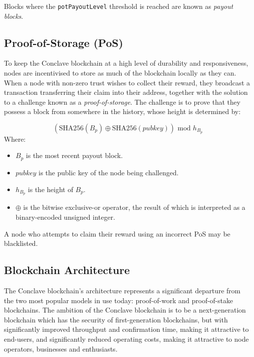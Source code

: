 \documentclass{report}
\begin{document}
		Blocks where the \texttt{potPayoutLevel} threshold is reached are known as \textit{payout blocks}. 
		
		\subsection{Proof-of-Storage (PoS)}
		To keep the Conclave blockchain at a high level of durability and responsiveness, nodes are incentivised to store as much of the blockchain locally as they can. When a node with non-zero trust wishes to collect their reward, they broadcast a transaction transferring their claim into their address, together with the solution to a challenge known as a \textit{proof-of-storage}.  The challenge  is to prove that they possess a block from somewhere in the history, whose height is determined by:
		
		\[ (\textrm{SHA256}(B_p) \oplus \textrm{SHA256}(pubkey)) \textrm{ mod } h_{B_p}  \] Where:
		
		\begin{itemize}
			\item $B_p$ is the most recent payout block.
			\item $pubkey$ is the public key of the node being challenged.
			\item $h_{B_p}$ is the height of $B_p$.
			\item $\oplus$ is the bitwise exclusive-or operator,  the result of which is interpreted as a binary-encoded unsigned integer.
		\end{itemize}
		
		A node who attempts to claim their reward using an incorrect PoS may be blacklisted. 
		
		\subsection{Blockchain Architecture}
		
		The Conclave blockchain's architecture represents a significant departure from the two most popular models in use today: proof-of-work and proof-of-stake  blockchains. The ambition of the Conclave blockchain is to be a next-generation blockchain which has the security of first-generation blockchains, but with significantly improved throughput and confirmation time, making it attractive to end-users, and significantly reduced operating costs, making it attractive to node operators, businesses and enthusiasts. \\
		
\end{document}
